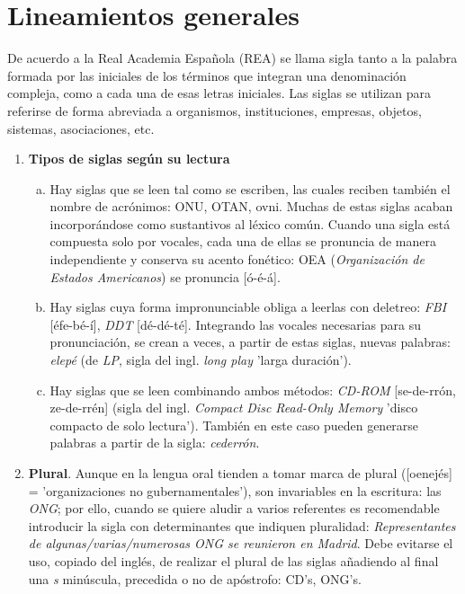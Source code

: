 \chapter{Lineamientos generales}



De acuerdo a la Real Academia Espa\~nola (REA) se llama sigla tanto a la palabra formada por las iniciales de los t\'erminos que integran una denominaci\'on compleja, como a cada una de esas letras iniciales. Las siglas se utilizan para referirse de forma abreviada a organismos, instituciones, empresas, objetos, sistemas, asociaciones, etc.



\begin{enumerate}[1)] 

	\item \textbf{Tipos de siglas seg\'un su lectura}
		\begin{enumerate}[a)]
			\item {Hay siglas que se leen tal como se escriben, las cuales reciben tambi\'en el nombre de acr\'onimos: ONU, OTAN, ovni. Muchas de estas siglas acaban incorpor\'andose como sustantivos al l\'exico com\'un. Cuando una sigla est\'a compuesta solo por vocales, cada una de ellas se pronuncia de manera independiente y conserva su acento fon\'etico: OEA (\textit{Organizaci\'on de Estados Americanos}) se pronuncia [\'o-\'e-\'a].}

			\item {Hay siglas cuya forma impronunciable obliga a leerlas con deletreo: \textit{FBI} [\'efe-b\'e-\'i], \textit{DDT} [d\'e-d\'e-t\'e]. Integrando las vocales necesarias para su pronunciaci\'on, se crean a veces, a partir de estas siglas, nuevas palabras: \textit{elep\'e} (de \textit{LP}, sigla del ingl. \textit{long play} 'larga duraci\'on').}
			
			\item {Hay siglas que se leen combinando ambos m\'etodos: \textit{CD-ROM} [se-de-rr\'on, ze-de-rr\'en] (sigla del ingl. \textit{Compact Disc Read-Only Memory} 'disco compacto de solo lectura'). Tambi\'en en este caso pueden generarse palabras a partir de la sigla: \textit{cederr\'on}.}
			
	\end{enumerate}

	\item \textbf{Plural}. Aunque en la lengua oral tienden a tomar marca de plural ([oenej\'es] = 'organizaciones no gubernamentales'), son invariables en la escritura: las \textit{ONG}; por ello, cuando se quiere aludir a varios referentes es recomendable introducir la sigla con determinantes que indiquen pluralidad: \textit{Representantes de algunas/varias/numerosas ONG se reunieron en Madrid}. Debe evitarse el uso, copiado del ingl\'es, de realizar el plural de las siglas a\~nadiendo al final una \textit{s} min\'uscula, precedida o no de ap\'ostrofo: {\color{red} CD's, ONG's}.


\end{enumerate}
